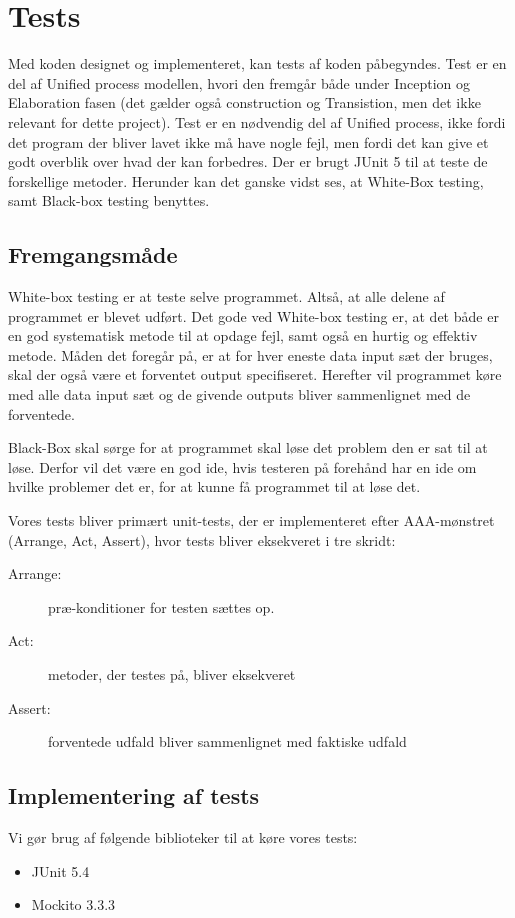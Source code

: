 \chapter{Tests}\label{ch:tests}
Med koden designet og implementeret, kan tests af koden påbegyndes. Test er en del af Unified process modellen, hvori den fremgår både under Inception og Elaboration fasen (det gælder også construction og Transistion, men det ikke relevant for dette project). Test er en nødvendig del af Unified process, ikke fordi det program der bliver lavet ikke må have nogle fejl, men fordi det kan give et godt overblik over hvad der kan forbedres\cite{sestoft2008systematic}. Der er brugt JUnit 5 til at teste de forskellige metoder. Herunder kan det ganske vidst ses, at White-Box testing, samt Black-box testing benyttes. 

\section{Fremgangsmåde}
White-box testing er at teste selve programmet. Altså, at alle delene af programmet er blevet udført. Det gode ved White-box testing er, at det både er en god systematisk metode til at opdage fejl, samt også en hurtig og effektiv metode. Måden det foregår på, er at for hver eneste data input sæt der bruges, skal der også være et forventet output specifiseret. Herefter vil programmet køre med alle data input sæt og de givende outputs bliver sammenlignet med de forventede\cite{sestoft2008systematic}.

Black-Box skal sørge for at programmet skal løse det problem den er sat til at løse. Derfor vil det være en god ide, hvis testeren på forehånd har en ide om hvilke problemer det er, for at kunne få programmet til at løse det\cite{sestoft2008systematic}. 

Vores tests bliver primært unit-tests, der er implementeret efter AAA-mønstret (Arrange, Act, Assert), hvor tests bliver eksekveret i tre skridt\cite{ArrangeActAssert}:
\begin{description}
    \item[Arrange:] præ-konditioner for testen sættes op.
    \item[Act:] metoder, der testes på, bliver eksekveret
    \item[Assert:] forventede udfald bliver sammenlignet med faktiske udfald 
\end{description}

\section{Implementering af tests}
Vi gør brug af følgende biblioteker til at køre vores tests:
\begin{itemize}
    \item JUnit 5.4
    \item Mockito 3.3.3
\end{itemize}

